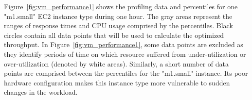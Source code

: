 

Figure~\ref{fig:vm_performance1} shows the profiling data and percentiles for one "m1.small" EC2 instance type during one hour. The gray areas represent the ranges of response times and CPU usage comprised by the percentiles. Black circles contain all data points that will be used to calculate the optimized throughput. In Figure~\ref{fig:vm_performance1}, some data points are excluded as they identify periods of time on which resource suffered from under-utilization or over-utilization (denoted by white areas). Similarly, a short number of data points are comprised between the percentiles for the "m1.small" instance. Its poor hardware configuration makes this instance type more vulnerable to sudden changes in the workload.



